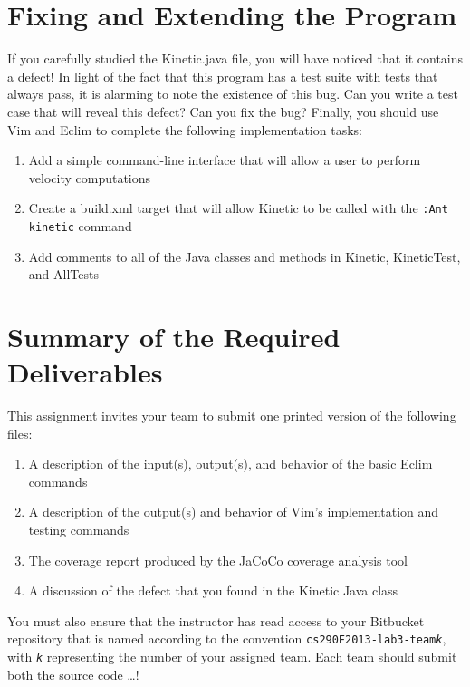 \section*{Fixing and Extending the Program}

If you carefully studied the Kinetic.java file, you will have noticed that it contains a defect! In light of the fact
that this program has a test suite with tests that always pass, it is alarming to note the existence of this bug. 
Can you write a test case that will reveal this defect? Can you fix the bug?  Finally, you should use Vim and Eclim to
complete the following implementation tasks:

\vspace*{-.1in}
\begin{enumerate}
	\item Add a simple command-line interface that will allow a user to perform velocity computations
	\item Create a build.xml target that will allow Kinetic to be called with the {\tt :Ant kinetic} command
	\item Add comments to all of the Java classes and methods in Kinetic, KineticTest, and AllTests
\end{enumerate}

\section*{Summary of the Required Deliverables}

This assignment invites your team to submit one printed version of the following files:

\begin{enumerate}
	
	\item A description of the input(s), output(s), and behavior of the basic Eclim commands 
	\item A description of the output(s) and behavior of Vim's implementation and testing commands
	\item The coverage report produced by the JaCoCo coverage analysis tool
	\item A discussion of the defect that you found in the Kinetic Java class

\end{enumerate}

You must also ensure that the instructor has read access to your Bitbucket repository that is named according to the
convention {\tt cs290F2013-lab3-team{\em k}}, with {\tt {\em k}} representing the number of your assigned team. 
Each team should submit both the source code \ldots !



